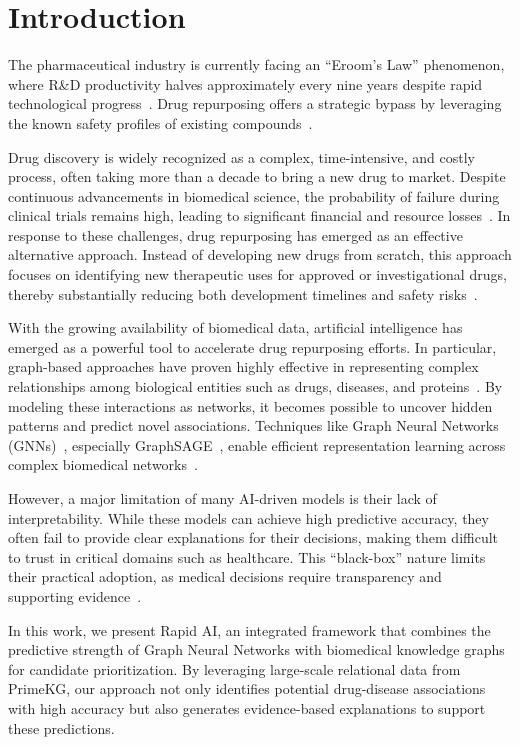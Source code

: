 \documentclass[conference,a4paper]{IEEEtran}
\begin{document}
\section{Introduction}

The pharmaceutical industry is currently facing an ``Eroom's Law'' phenomenon, where R\&D productivity halves approximately every nine years despite rapid technological progress~\cite{ref_eroom}. Drug repurposing offers a strategic bypass by leveraging the known safety profiles of existing compounds~\cite{ref6,ref7}.

Drug discovery is widely recognized as a complex, time-intensive, and costly process, often taking more than a decade to bring a new drug to market. Despite continuous advancements in biomedical science, the probability of failure during clinical trials remains high, leading to significant financial and resource losses~\cite{ref6}. In response to these challenges, drug repurposing has emerged as an effective alternative approach. Instead of developing new drugs from scratch, this approach focuses on identifying new therapeutic uses for approved or investigational drugs, thereby substantially reducing both development timelines and safety risks~\cite{ref7}.

With the growing availability of biomedical data, artificial intelligence has emerged as a powerful tool to accelerate drug repurposing efforts. In particular, graph-based approaches have proven highly effective in representing complex relationships among biological entities such as drugs, diseases, and proteins~\cite{ref3,ref18}. By modeling these interactions as networks, it becomes possible to uncover hidden patterns and predict novel associations. Techniques like Graph Neural Networks (GNNs)~\cite{ref2,ref4}, especially GraphSAGE~\cite{ref1}, enable efficient representation learning across complex biomedical networks~\cite{ref17,ref24}.

However, a major limitation of many AI-driven models is their lack of interpretability. While these models can achieve high predictive accuracy, they often fail to provide clear explanations for their decisions, making them difficult to trust in critical domains such as healthcare. This ``black-box'' nature limits their practical adoption, as medical decisions require transparency and supporting evidence~\cite{ref4}.

In this work, we present Rapid AI, an integrated framework that combines the predictive strength of Graph Neural Networks with biomedical knowledge graphs for candidate prioritization. By leveraging large-scale relational data from PrimeKG, our approach not only identifies potential drug-disease associations with high accuracy but also generates evidence-based explanations to support these predictions.
\end{document}
